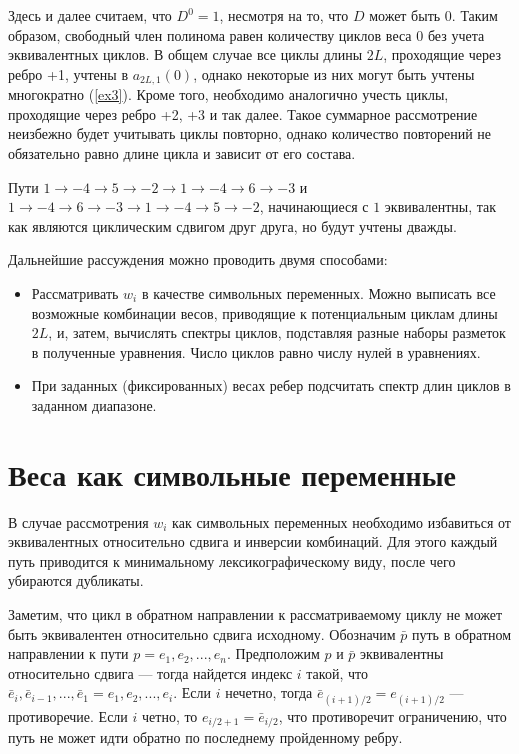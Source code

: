 Здесь и далее считаем, что $D^0=1$, несмотря на то, что $D$ может быть $0$. Таким образом,
свободный член полинома равен количеству циклов веса $0$ без учета эквивалентных циклов.
В общем случае все циклы длины $2L$, проходящие через ребро +1, учтены в $a_{2L,1}(0)$, однако
некоторые из них могут быть учтены многократно (\ref{ex3}). Кроме того, необходимо аналогично учесть
циклы, проходящие через ребро +2, +3 и так далее. Такое суммарное рассмотрение неизбежно
будет учитывать циклы повторно, однако количество повторений не обязательно равно длине цикла и
зависит от его состава.
\begin{example} \label{ex3}

 Пути $1 \to -4 \to 5 \to -2 \to 1 \to -4 \to 6 \to -3$ и $1 \to -4 \to 6 \to -3 \to 1 \to -4 \to 5 \to -2$,
начинающиеся с $1$ эквивалентны, так как являются циклическим сдвигом друг друга, но будут учтены дважды. 
\end{example}

Дальнейшие рассуждения можно проводить двумя способами:
\begin{itemize}
  \item
  Рассматривать $w_i$ в качестве символьных переменных. 
Можно выписать все возможные комбинации весов, приводящие к потенциальным 
циклам длины $2L$, и, затем, вычислять спектры циклов, подставляя разные 
наборы разметок в полученные уравнения. Число циклов равно числу нулей в уравнениях.  
\item
  При заданных (фиксированных) весах ребер подсчитать спектр длин циклов в заданном диапазоне.
\end{itemize}

\section{Веса как символьные переменные}
В случае рассмотрения $w_i$ как символьных переменных необходимо избавиться от эквивалентных
относительно сдвига и инверсии комбинаций. Для этого каждый путь приводится к минимальному 
лексикографическому виду, после чего убираются дубликаты. 

Заметим, что цикл в обратном направлении
к рассматриваемому циклу не может быть эквивалентен относительно сдвига исходному.
Обозначим $\bar{p}$ путь в обратном направлении к пути $p=e_1,e_2,...,e_n$. 
Предположим $p$ и $\bar{p}$ эквивалентны относительно сдвига --- тогда найдется индекс $i$ такой, что
$\bar{e}_i, \bar{e}_{i-1}, ..., \bar{e}_1 = e_1, e_2, ..., e_i$.  Если $i$ нечетно, тогда $\bar{e}_{(i + 1)/2} = e_{(i+1)/2}$ --- противоречие.
 Если $i$ четно, то $e_{i/2 + 1}=\bar{e}_{i/2}$, что противоречит ограничению, что путь не может
идти обратно по последнему пройденному ребру.

